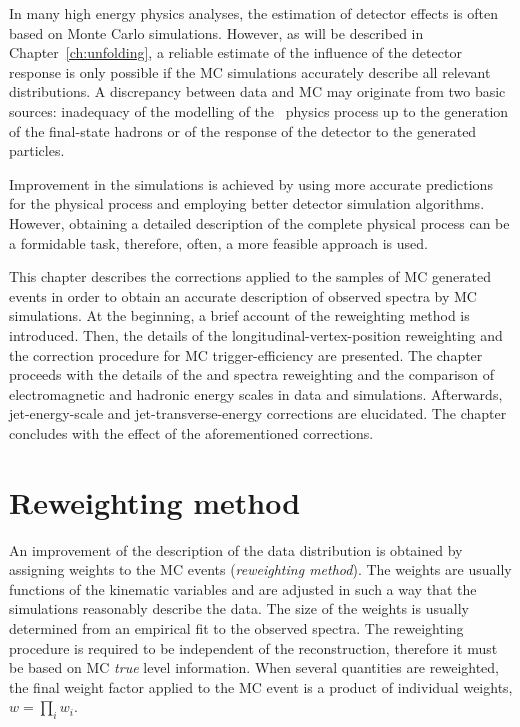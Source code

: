 In many high energy physics analyses, the estimation of detector effects is often based on Monte Carlo simulations. However, as will be described in Chapter~\ref{ch:unfolding}, a reliable estimate of the influence of the detector response is only possible if the MC simulations accurately describe all relevant distributions. %
 A discrepancy between data and MC may originate from two basic sources: inadequacy of the modelling of the \ep~physics process up to the generation of the final-state hadrons or of the response of the detector to the generated particles.
 
Improvement in the simulations is achieved by using more accurate predictions for the physical process and employing better detector simulation algorithms. However, obtaining a detailed description of the complete physical process can be a formidable task, therefore, often, a more feasible approach is used.

This chapter describes the corrections applied to the samples of MC generated events in order to obtain an accurate description of observed spectra by MC simulations. At the beginning, a brief account of the reweighting method is introduced. Then, the details of the longitudinal-vertex-position reweighting and the correction procedure for MC trigger-efficiency are presented. The chapter proceeds with the details of the \qsq and \etjetb spectra reweighting and the comparison of electromagnetic and hadronic energy scales in data and simulations. Afterwards, jet-energy-scale and jet-transverse-energy corrections are elucidated. The chapter concludes with the effect of the aforementioned corrections.

\section{Reweighting method}

An improvement of the description of the data distribution is obtained by assigning weights to the MC events (\emph{reweighting method}). The weights are usually functions of the kinematic variables and are adjusted in such a way that the simulations reasonably describe the data. The size of the weights is usually determined from an empirical fit to the observed spectra. The reweighting procedure is required to be independent of the reconstruction, therefore it must be based on MC \emph{true} level information. When several quantities are reweighted, the final weight factor applied to the MC event is a product of individual weights, $w = \prod_i w_i$. 

